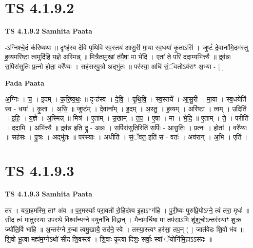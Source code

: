 \documentclass[17pt]{extarticle}
\begin{document}

\section{ TS 4.1.9.2 }

\textbf{TS 4.1.9.2 } \newline
\textbf{Samhita Paata} \newline

-ऽग्निश्चे॒दं क॑रिष्यथः ॥ दृꣳह॑स्व देवि पृथिवि स्व॒स्तय॑ आसु॒री मा॒या स्व॒धया॑ कृ॒ताऽसि॑ । जुष्टं॑ दे॒वाना॑मि॒दम॑स्तु ह॒व्यमरि॑ष्टा॒ त्वमुदि॑हि य॒ज्ञे अ॒स्मिन्न् ॥ मित्रै॒तामु॒खां त॑पै॒षा मा भे॑दि । ए॒तां ते॒ परि॑ ददा॒म्यभि॑त्त्यै ॥ द्र्व॑न्नः स॒र्पिरा॑सुतिः प्र॒त्नो होता॒ वरे᳚ण्यः । सह॑सस्पु॒त्रो अद्भु॑तः ॥ पर॑स्या॒ अधि॑ सं॒ॅवतोऽव॑राꣳ अ॒भ्या - [  ] \newline

\textbf{Pada Paata} \newline

अ॒ग्निः । च॒ । इ॒दम् । क॒रि॒ष्य॒थः॒ ॥ दृꣳह॑स्व । दे॒वि॒ । पृ॒थि॒वि॒ । स्व॒स्तये᳚ । आ॒सु॒री । मा॒या । स्व॒धयेति॑ स्व - धया᳚ । कृ॒ता । अ॒सि॒ ॥ जुष्ट᳚म् । दे॒वाना᳚म् । इ॒दम् । अ॒स्तु॒ । ह॒व्यम् । अरि॑ष्टा । त्वम् । उदिति॑ । इ॒हि॒ । य॒ज्ञे । अ॒स्मिन्न् ॥ मित्र॑ । ए॒ताम् । उ॒खाम् । त॒प॒ । ए॒षा । मा । भे॒दि॒ ॥ ए॒ताम् । ते॒ । परीति॑ । द॒दा॒मि॒ । अभि॑त्त्यै ॥ द्र्‌व॑न्न॒ इति॒ द्रु - अ॒न्नः॒ । स॒र्पिरा॑सुति॒रिति॑ स॒र्पिः - आ॒सु॒तिः॒ । प्र॒त्नः । होता᳚ । वरे᳚ण्यः ॥ सह॑सः । पु॒त्रः । अद्भु॑तः ॥ पर॑स्याः । अधीति॑ । सं॒ॅवत॒ इति॑ सं - वतः॑ । अव॑रान् । अ॒भि । एति॑ ।  \newline





\section{ TS 4.1.9.3 }

\textbf{TS 4.1.9.3 } \newline
\textbf{Samhita Paata} \newline

त॑र । यत्रा॒हमस्मि॒ ताꣳ अ॑व ॥ प॒र॒मस्याः᳚ परा॒वतो॑ रो॒हिद॑श्व इ॒हाऽ*ग॑हि । पु॒री॒ष्यः॑ पुरुप्रि॒योऽग्ने॒ त्वं त॑रा॒ मृधः॑ ॥ सीद॒ त्वं मा॒तुर॒स्या उ॒पस्थे॒ विश्वा᳚न्यग्ने व॒युना॑नि वि॒द्वान् । मैना॑म॒र्चिषा॒ मा तप॑सा॒ऽभि शू॑शुचो॒ऽन्तर॑स्याꣳ शु॒क्र ज्यो॑ति॒र्वि भा॑हि ॥ अ॒न्तर॑ग्ने रु॒चा त्वमु॒खायै॒ सद॑ने॒ स्वे । तस्या॒स्त्वꣳ हर॑सा॒ तप॒न् ( ) जात॑वेदः शि॒वो भ॑व ॥ शि॒वो भू॒त्वा मह्य॑म॒ग्नेऽथो॑ सीद शि॒वस्त्वं । शि॒वाः कृ॒त्वा दिशः॒ सर्वाः॒ स्वां ॅयोनि॑मि॒हाऽऽस॑दः ॥ \newline
\end{document}
